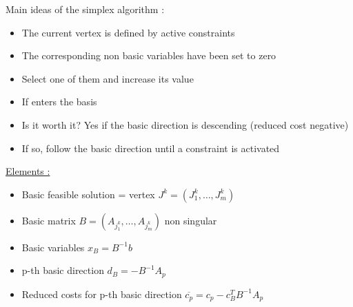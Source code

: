 \documentclass[../main.tex]{subfiles}
\begin{document}
Main ideas of the simplex algorithm : \begin{itemize}
    \item The current vertex is defined by active constraints\\
    \item The corresponding non basic variables have been set to zero\\
    \item Select one of them and increase its value\\
    \item If enters the basis\\
    \item Is it worth it? Yes if the basic direction is descending (reduced cost negative)\\
    \item If so, follow the basic direction until a constraint is activated\\
\end{itemize}

\quad \underline{Elements :}\begin{itemize}
    \item Basic feasible solution = vertex $J^k = (J_1^k, \dots, J_m^k)$\\
    \item Basic matrix $B = (A_{j_1^k}, \dots, A_{j_m^k})$ non singular\\
    \item Basic variables $x_B = B^{-1}b$\\
    \item p-th basic direction $d_B = -B^{-1}A_p$\\
    \item Reduced costs for p-th basic direction $\overline{c_p} = c_p - c_B^T B^{-1}A_p$\\
\end{itemize}
\end{document}
